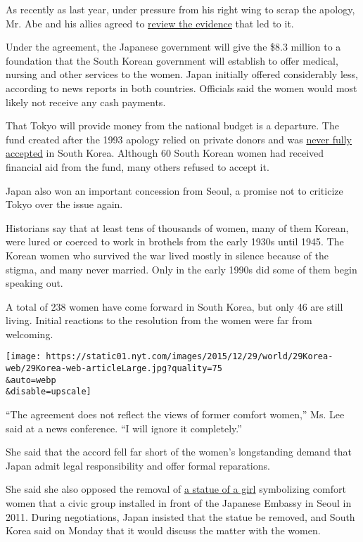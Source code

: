 As recently as last year, under pressure from his right wing to scrap
the apology, Mr. Abe and his allies agreed to
\href{http://www.nytimes.com/2014/03/01/world/asia/japan-to-review-apology-made-to-wwii-comfort-women.html}{review
the evidence} that led to it.

Under the agreement, the Japanese government will give the \$8.3 million
to a foundation that the South Korean government will establish to offer
medical, nursing and other services to the women. Japan initially
offered considerably less, according to news reports in both countries.
Officials said the women would most likely not receive any cash
payments.

That Tokyo will provide money from the national budget is a departure.
The fund created after the 1993 apology relied on private donors and was
\href{http://www.nytimes.com/2007/04/25/world/asia/25japan.html}{never
fully accepted} in South Korea. Although 60 South Korean women had
received financial aid from the fund, many others refused to accept it.

Japan also won an important concession from Seoul, a promise not to
criticize Tokyo over the issue again.

Historians say that at least tens of thousands of women, many of them
Korean, were lured or coerced to work in brothels from the early 1930s
until 1945. The Korean women who survived the war lived mostly in
silence because of the stigma, and many never married. Only in the early
1990s did some of them begin speaking out.

A total of 238 women have come forward in South Korea, but only 46 are
still living. Initial reactions to the resolution from the women were
far from welcoming.

\texttt{[image: https://static01.nyt.com/images/2015/12/29/world/29Korea-web/29Korea-web-articleLarge.jpg?quality=75\\\&auto=webp\\\&disable=upscale]}

``The agreement does not reflect the views of former comfort women,''
Ms. Lee said at a news conference. ``I will ignore it completely.''

She said that the accord fell far short of the women's longstanding
demand that Japan admit legal responsibility and offer formal
reparations.

She said she also opposed the removal of
\href{http://www.nytimes.com/2011/12/16/world/asia/statute-in-seoul-becomes-focal-point-of-dispute-between-south-korea-and-japan.html}{a
statue of a girl} symbolizing comfort women that a civic group installed
in front of the Japanese Embassy in Seoul in 2011. During negotiations,
Japan insisted that the statue be removed, and South Korea said on
Monday that it would discuss the matter with the women.

